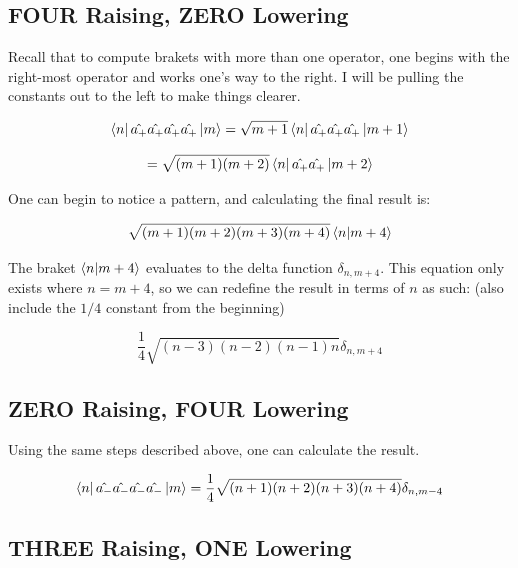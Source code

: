 \documentclass[12pt]{article}
\begin{document}
\subsection*{FOUR Raising, ZERO Lowering}

Recall that to compute brakets with more than one operator, one begins with the right-most operator and works one's way to the right. I will be pulling the constants out to the left to make things clearer.

\begin{equation}
\bra{n} \hat{a_+}\hat{a_+}\hat{a_+}\hat{a_+} \ket{m} = \sqrt{m+1}\bra{n} \hat{a_+}\hat{a_+}\hat{a_+} \ket{m + 1}
\end{equation}

\begin{equation}
= \sqrt{(m+1)(m+2)}\bra{n} \hat{a_+}\hat{a_+}\ket{m + 2}
\end{equation}

One can begin to notice a pattern, and calculating the final result is:

\begin{equation}
\sqrt{(m+1)(m+2)(m+3)(m+4)}\braket{n|m + 4}
\end{equation}

The braket $\braket{n|m + 4}$ evaluates to the delta function $\delta_{n, m+4}$. This equation only exists where $n = m+4$, so we can redefine the result in terms of $n$ as such: (also include the $1/4$ constant from the beginning)

\begin{equation}
\frac{1}{4}\sqrt{ (n-3) (n-2) (n-1) n } \delta_{n, m+4}
\end{equation}

\subsection*{ZERO Raising, FOUR Lowering}

Using the same steps described above, one can calculate the result.

\begin{equation}
\bra{n} \hat{a_-}\hat{a_-}\hat{a_-}\hat{a_-} \ket{m} = \frac{1}{4}\sqrt{ (n+1) (n+2) (n+3) (n+4) } \delta_{n, m-4}
\end{equation}

\subsection*{THREE Raising, ONE Lowering}
\end{document}
